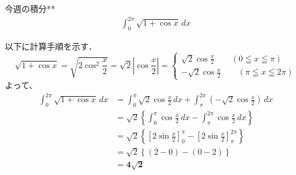 \documentclass[main]{subfiles}
\begin{document}

\begin{mondai}{2}{今週の積分}{**}
    \begin{align*}
        \int_0^{2\pi} \sqrt{1+\cos x} \, dx
    \end{align*}
\end{mondai}


\solutionhead
\hfill
以下に計算手順を示す．
\hfill\
\begin{equation*}
    \sqrt{1+\cos x} = \sqrt{2\cos ^2 \frac{x}{2}} = \sqrt{2}\left| \cos \frac{x}{2} \right| = 
    \begin{cases}
        \sqrt{2} \cos \frac{x}{2} \qquad (0\leqq x \leqq \pi)\\
        -\sqrt{2} \cos \frac{x}{2} \qquad (\pi\leqq x \leqq 2\pi)
    \end{cases}
\end{equation*}
よって、
\begin{align*}
    \int ^{2\pi}_0 \sqrt{1+\cos x} \, dx
        &= \int^\pi_0 \sqrt{2} \cos \frac{x}{2} \, dx + \int^{2\pi}_\pi \left(-\sqrt{2} \cos \frac{x}{2}\right) \, dx \\
        &= \sqrt{2} \left\{\int^\pi_0 \cos \frac{x}{2} \, dx - \int^{2\pi}_\pi \cos \frac{x}{2} \, dx \right\} \\
        &= \sqrt{2} \left\{ \left[ 2\sin \frac{x}{2} \right]^\pi_0 - \left[ 2\sin \frac{x}{2} \right]^{2\pi}_\pi \right\} \\
        &= \sqrt{2} \left\{ (2-0) - (0-2) \right\} \\
        &= \boldsymbol{4 \sqrt{2}}
\end{align*}
\end{document}
